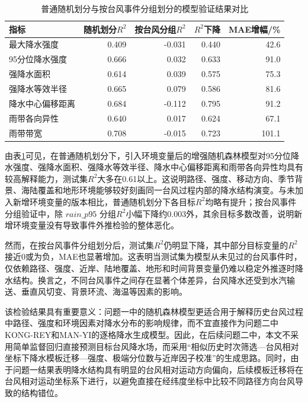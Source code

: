 \documentclass[UTF8,a4paper,zihao=5,fontset=fandol]{ctexart}
\numberwithin{equation}{section}
\numberwithin{figure}{section}
\numberwithin{table}{section}
\begin{document}
\begin{table}[htbp]
    \centering
    \caption{普通随机划分与按台风事件分组划分的模型验证结果对比}
    \label{tab:random_vs_group_validation_problem1}
    \small
    \begin{tabular}{lrrrr}
        \hline
        指标 & 随机划分$R^2$ & 按台风分组$R^2$ & $R^2$下降 & MAE增幅/\% \\
        \hline
        最大降水强度 & 0.409 & -0.031 & 0.440 & 42.6 \\
        95分位降水强度 & 0.666 & 0.032 & 0.633 & 91.0 \\
        强降水面积 & 0.614 & 0.039 & 0.575 & 75.3 \\
        强降水等效半径 & 0.665 & 0.079 & 0.586 & 81.6 \\
        降水中心偏移距离 & 0.684 & -0.112 & 0.795 & 91.2 \\
        雨带各向异性 & 0.640 & 0.017 & 0.624 & 67.1 \\
        雨带带宽 & 0.708 & -0.015 & 0.723 & 101.1 \\
        \hline
    \end{tabular}
\end{table}

由表\ref{tab:random_vs_group_validation_problem1}可见，在普通随机划分下，引入环境变量后的增强随机森林模型对95分位降水强度、强降水面积、强降水等效半径、降水中心偏移距离和雨带各向异性均具有较高解释能力，测试集$R^2$大多在0.61以上。这说明路径、强度、移动方向、季节背景、海陆覆盖和地形环境能够较好刻画同一台风过程内部的降水结构演变。与未加入新增环境变量的版本相比，普通随机划分下各目标$R^2$均略有提升；按台风事件分组验证中，除 $rain\_p95$ 分组$R^2$小幅下降约0.003外，其余目标多数改善，说明新增环境变量没有导致事件外推检验的整体恶化。

然而，在按台风事件分组划分后，测试集$R^2$仍明显下降，其中部分目标变量的$R^2$接近0或为负，MAE也显著增加。这表明当测试集为模型从未见过的台风事件时，仅依赖路径、强度、近岸、陆地覆盖、地形和时间背景变量仍难以稳定外推逐时降水结构。换言之，不同台风事件之间存在显著个体差异，台风降水还受到水汽输送、垂直风切变、背景环流、海温等因素的影响。

该检验结果具有重要意义：问题一中的随机森林模型更适合用于解释历史台风过程中路径、强度和环境因素对降水分布的影响规律，而不宜直接作为问题二中KONG-REY和MAN-YI的逐格降水生成模型。因此，在后续问题二中，本文不采用简单监督回归直接预测目标台风降水场，而采用“相似历史时次筛选—台风相对坐标下降水模板迁移—强度、极端分位数与近岸因子校准”的生成思路。同时，由于问题一结果表明降水结构具有明显的台风相对运动方向偏向，后续模板迁移将在台风相对运动坐标系下进行，以避免直接在经纬度坐标中比较不同路径方向台风导致的结构错位。
\end{document}
